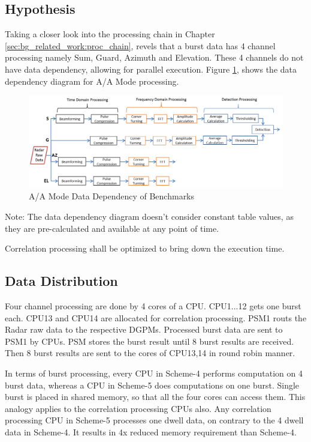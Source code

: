 \subsection{Hypothesis}
\begin{compactitem}

\item Taking a closer look into the processing chain in Chapter \ref{sec:bg_related_work:proc_chain}, revels that a burst data has 4 channel processing namely Sum, Guard, Azimuth and Elevation.  These 4 channels do not have data dependency, allowing for parallel execution. Figure \ref{fig:mm:scheme5_data_path}, shows the data dependency diagram for A/A Mode processing.

\begin{figure}[h!]
	\centering
	\includegraphics[width=160mm]{figures/scheme5_data_path}
	\caption{A/A Mode Data Dependency of Benchmarks}
	\label{fig:mm:scheme5_data_path}
\end{figure}
Note: The data dependency diagram doesn't consider constant table values, as they are pre-calculated and available at any point of time.

\item Correlation processing shall be optimized to bring down the execution time.
\end{compactitem}

\subsection{Data Distribution}
\label{ss:mm:scheme5:data_distribution}
Four channel processing are done by 4 cores of a CPU. CPU1...12 gets one burst each. CPU13 and CPU14 are allocated for correlation processing. 
PSM1 routs the Radar raw data to the respective DGPMs. Processed burst data are sent to PSM1 by CPUs. PSM stores the burst result until 8 burst results are received. Then 8 burst results are sent to the cores of CPU13,14 in round robin manner. 

In terms of burst processing, every CPU in Scheme-4 performs computation on 4 burst data, whereas a CPU in Scheme-5 does computations on one burst. Single burst is placed in shared memory, so that all the four cores can access them. This analogy applies to the correlation processing CPUs also. Any correlation processing CPU in Scheme-5 processes one dwell data, on contrary to the 4 dwell data in Scheme-4. It results in 4x reduced memory requirement than Scheme-4.

